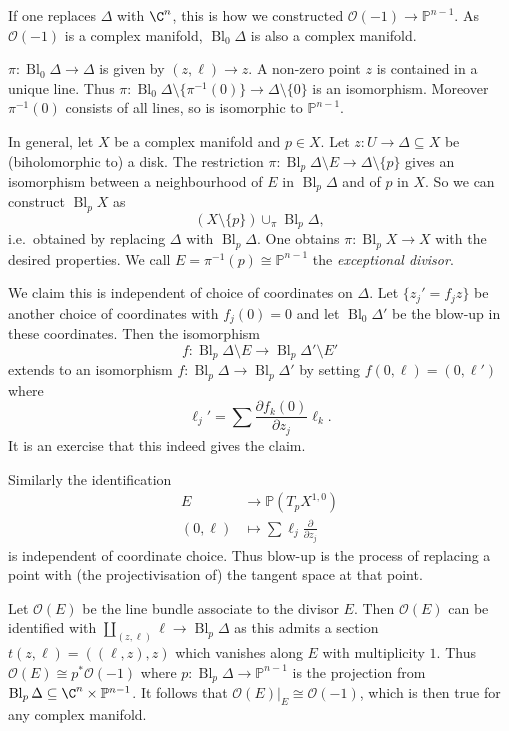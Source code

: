 \documentclass[a4paper]{article}
\renewcommand{\P}{\mathbb P} %
\DeclareMathOperator{\Bl}{Bl} %
\begin{document}
If one replaces \(\Delta\) with \(\C^n\), this is how we constructed \(\mathcal O(-1) \to \P^{n - 1}\). As \(\mathcal O(-1)\) is a complex manifold, \(\Bl_0 \Delta\) is also a complex manifold.

\(\pi: \Bl_0 \Delta \to \Delta\) is given by \((z, \ell) \to z\). A non-zero point \(z\) is contained in a unique line. Thus \(\pi: \Bl_0 \Delta \setminus \{\pi^{-1}(0)\} \to \Delta \setminus \{0\}\) is an isomorphism. Moreover \(\pi^{-1}(0)\) consists of all lines, so is isomorphic to \(\P^{n - 1}\).

In general, let \(X\) be a complex manifold and \(p \in X\). Let \(z: U \to \Delta \subseteq X\) be (biholomorphic to) a disk. The restriction \(\pi: \Bl_p\Delta \setminus E \to \Delta \setminus \{p\}\) gives an isomorphism between a neighbourhood of \(E\) in \(\Bl_p \Delta\) and of \(p\) in \(X\). So we can construct \(\Bl_p X\) as
\[
  (X \setminus \{p\}) \cup_\pi \Bl_p \Delta,
\]
i.e.\ obtained by replacing \(\Delta\) with \(\Bl_p \Delta\). One obtains \(\pi: \Bl_p X \to X\) with the desired properties. We call \(E = \pi^{-1}(p) \cong \P^{n - 1}\) the \emph{exceptional divisor}.

We claim this is independent of choice of coordinates on \(\Delta\). Let \(\{z_j' = f_j z\}\) be another choice of coordinates with \(f_j(0) = 0\) and let \(\Bl_0 \Delta'\) be the blow-up in these coordinates. Then the isomorphism
\[
  f: \Bl_p \Delta \setminus E \to \Bl_p \Delta' \setminus E'
\]
extends to an isomorphism \(f: \Bl_p \Delta \to \Bl_p \Delta'\) by setting \(f(0, \ell) = (0, \ell')\) where
\[
  \ell_j' = \sum \frac{\partial f_k(0)}{\partial z_j} \ell_k.
\]
It is an exercise that this indeed gives the claim.

Similarly the identification
\begin{align*}
  E &\to \P(T_p X^{1, 0}) \\
  (0, \ell) &\mapsto \sum \ell_j \frac{\partial  }{\partial z_j}
\end{align*}
is independent of coordinate choice. Thus blow-up is the process of replacing a point with (the projectivisation of) the tangent space at that point.

Let \(\mathcal O(E)\) be the line bundle associate to the divisor \(E\). Then \(\mathcal O(E)\) can be identified with \(\coprod_{(z, \ell)} \ell \to \Bl_p \Delta\) as this admits a section \(t(z, \ell) = ((\ell, z), z)\) which vanishes along \(E\) with multiplicity \(1\). Thus \(\mathcal O(E) \cong p^* \mathcal O(-1)\) where \(p: \Bl_p \Delta \to \P^{n - 1}\) is the projection from \(\Bl_p \Delta \subseteq \C^n \times \P^{n - 1}\). It follows that \(\mathcal O(E)|_E \cong \mathcal O(-1)\), which is then true for any complex manifold.
\end{document}
